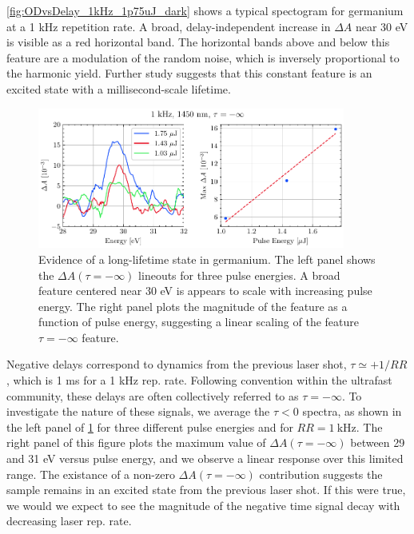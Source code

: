 \cref{fig:ODvsDelay_1kHz_1p75uJ_dark} shows a typical spectogram for germanium at a 1 kHz repetition rate. A broad, delay-independent increase in $\Delta A$ near 30 eV is visible as a red horizontal band. The horizontal bands above and below this feature are a modulation of the random noise, which is inversely proportional to the harmonic yield. Further study suggests that this constant feature is an excited state with a millisecond-scale lifetime.

\begin{figure}
	\centering
	\includegraphics[width=0.90\textwidth]{figures/chap4/neg_inf_PulseEnergy_scaling_1kHz.pdf}
	\caption{Evidence of a long-lifetime state in germanium. The left panel shows the $\Delta A(\tau=-\infty)$ lineouts for three pulse energies. A broad feature centered near 30 eV is appears to scale with increasing pulse energy. The right panel plots the magnitude of the feature as a function of pulse energy, suggesting a linear scaling of the feature $\tau=-\infty$ feature.}
	\label{fig:neg_inf_PulseEnergy_scaling_1kHz}
\end{figure}

Negative delays correspond to dynamics from the previous laser shot, $\tau \simeq +1/RR$, which is 1 ms for a 1 kHz rep. rate. Following convention within the ultrafast community, these delays are often collectively referred to as $\tau = -\infty$. To investigate the nature of these signals, we average the $\tau < 0$ spectra, as shown in the left panel of \cref{fig:neg_inf_PulseEnergy_scaling_1kHz} for three different pulse energies and for $RR = 1 \ \textrm{kHz}$. The right panel of this figure plots the maximum value of $\Delta A(\tau=-\infty)$ between 29 and 31 eV versus pulse energy, and we observe a linear response over this limited range. The existance of a non-zero $\Delta A(\tau=-\infty)$ contribution suggests the sample remains in an excited state from the previous laser shot. If this were true, we would we expect to see the magnitude of the negative time signal decay with decreasing laser rep. rate.

